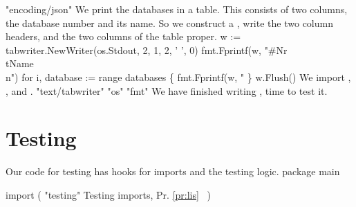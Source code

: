 "encoding/json"
\nwendcode{}\nwdocspar
We print the databases in a table. This consists of two columns, the
database number and its name. So we construct a , write
the two column headers, and the two columns of the table proper.
\nwenddocs{}\endmoddef\nwstartdeflinemarkup{}\nwenddeflinemarkup
w := tabwriter.NewWriter(os.Stdout, 2, 1, 2, ' ', 0)
fmt.Fprintf(w, "#Nr\\tName\\n")
for i, database := range databases \{
        fmt.Fprintf(w, "%
\}
w.Flush()
\nwendcode{}\nwdocspar
We import , , and .
\nwenddocs{}\plusendmoddef\nwstartdeflinemarkup{}\nwenddeflinemarkup
"text/tabwriter"
"os"
"fmt"
\nwendcode{}\nwdocspar
We have finished writing , time to test it.

\section*{Testing}
Our code for testing  has hooks for imports and the
testing logic.
\nwenddocs{}\endmoddef\nwstartdeflinemarkup\nwenddeflinemarkup
package main

import (
        "testing"
        \LA{}Testing imports, Pr. \ref{pr:lis}~{\nwtagstyle{}}\RA{}
)

